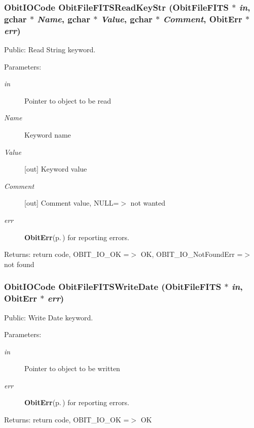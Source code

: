 \subsubsection{\setlength{\rightskip}{0pt plus 5cm}Obit\-IOCode Obit\-File\-FITSRead\-Key\-Str ({\bf Obit\-File\-FITS} $\ast$ {\em in}, gchar $\ast$ {\em Name}, gchar $\ast$ {\em Value}, gchar $\ast$ {\em Comment}, {\bf Obit\-Err} $\ast$ {\em err})}\label{ObitFileFITS_8c_a17}


Public: Read String keyword. 

\begin{Desc}
\item[Parameters:]
\begin{description}
\item[{\em in}]Pointer to object to be read \item[{\em Name}]Keyword name \item[{\em Value}][out] Keyword value \item[{\em Comment}][out] Comment value, NULL=$>$ not wanted \item[{\em err}]{\bf Obit\-Err}{\rm (p.\,\pageref{structObitErr})} for reporting errors. \end{description}
\end{Desc}
\begin{Desc}
\item[Returns:]return code, OBIT\_\-IO\_\-OK =$>$ OK, OBIT\_\-IO\_\-Not\-Found\-Err =$>$ not found \end{Desc}
\subsubsection{\setlength{\rightskip}{0pt plus 5cm}Obit\-IOCode Obit\-File\-FITSWrite\-Date ({\bf Obit\-File\-FITS} $\ast$ {\em in}, {\bf Obit\-Err} $\ast$ {\em err})}\label{ObitFileFITS_8c_a28}


Public: Write Date keyword. 

\begin{Desc}
\item[Parameters:]
\begin{description}
\item[{\em in}]Pointer to object to be written \item[{\em err}]{\bf Obit\-Err}{\rm (p.\,\pageref{structObitErr})} for reporting errors. \end{description}
\end{Desc}
\begin{Desc}
\item[Returns:]return code, OBIT\_\-IO\_\-OK =$>$ OK \end{Desc}
